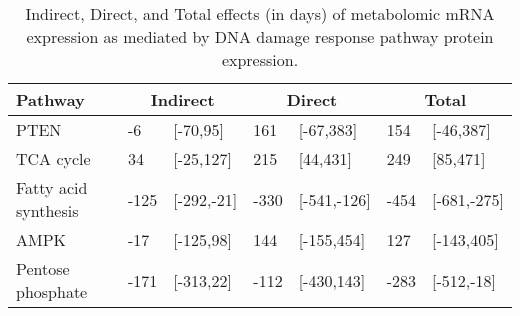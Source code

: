 \begin{table}[ht]
\centering
\begin{tabular}{lllllll}
  \hline
  Pathway & \multicolumn{2}{c}{Indirect} & \multicolumn{2}{c}{Direct}  & \multicolumn{2}{c}{Total} \\
 \hline
PTEN & -6 & [-70,95] & 161 & [-67,383] & 154 & [-46,387] \\ 
  TCA cycle & 34 & [-25,127] & 215 & [44,431] & 249 & [85,471] \\ 
  Fatty acid synthesis & -125 & [-292,-21] & -330 & [-541,-126] & -454 & [-681,-275] \\ 
  AMPK & -17 & [-125,98] & 144 & [-155,454] & 127 & [-143,405] \\ 
  Pentose phosphate & -171 & [-313,22] & -112 & [-430,143] & -283 & [-512,-18] \\ 
   \hline
\end{tabular}
\caption{Indirect, Direct, and Total effects (in days) of metabolomic mRNA expression as mediated by DNA damage response pathway protein expression.} 
\end{table}
